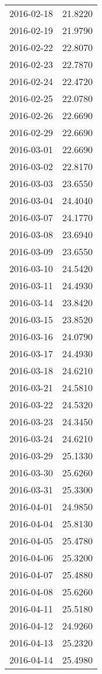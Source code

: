 \begin{tabular}{lr}
2016-02-18 &     21.8220 \\
2016-02-19 &     21.9790 \\
2016-02-22 &     22.8070 \\
2016-02-23 &     22.7870 \\
2016-02-24 &     22.4720 \\
2016-02-25 &     22.0780 \\
2016-02-26 &     22.6690 \\
2016-02-29 &     22.6690 \\
2016-03-01 &     22.6690 \\
2016-03-02 &     22.8170 \\
2016-03-03 &     23.6550 \\
2016-03-04 &     24.4040 \\
2016-03-07 &     24.1770 \\
2016-03-08 &     23.6940 \\
2016-03-09 &     23.6550 \\
2016-03-10 &     24.5420 \\
2016-03-11 &     24.4930 \\
2016-03-14 &     23.8420 \\
2016-03-15 &     23.8520 \\
2016-03-16 &     24.0790 \\
2016-03-17 &     24.4930 \\
2016-03-18 &     24.6210 \\
2016-03-21 &     24.5810 \\
2016-03-22 &     24.5320 \\
2016-03-23 &     24.3450 \\
2016-03-24 &     24.6210 \\
2016-03-29 &     25.1330 \\
2016-03-30 &     25.6260 \\
2016-03-31 &     25.3300 \\
2016-04-01 &     24.9850 \\
2016-04-04 &     25.8130 \\
2016-04-05 &     25.4780 \\
2016-04-06 &     25.3200 \\
2016-04-07 &     25.4880 \\
2016-04-08 &     25.6260 \\
2016-04-11 &     25.5180 \\
2016-04-12 &     24.9260 \\
2016-04-13 &     25.2320 \\
2016-04-14 &     25.4980 \\

\end{tabular}
